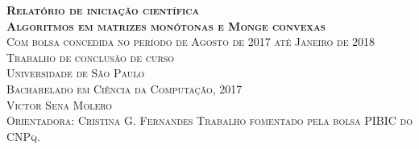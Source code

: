 \documentclass[11pt,openany]{book}
\begin{document}

\frontmatter

\thispagestyle{empty}
\begin{center}
\Large \textbf{\textsc{Relatório de iniciação científica}} \\
\large \textbf{\textsc{Algoritmos em matrizes monótonas e Monge convexas}} \\
\large \textsc{Com bolsa concedida no período de Agosto de 2017 até Janeiro de 2018} \\[120 pt]
\large \textsc{Trabalho de conclusão de curso} \\
\large \textsc{Universidade de São Paulo} \\
\large \textsc{Bacharelado em Ciência da Computação, 2017}\\[120pt]
\large \textsc{Victor Sena Molero} \\
\large \textsc{Orientadora: Cristina G. Fernandes}
\vfill
\large \textsc{Trabalho fomentado pela bolsa PIBIC do CNPq.}
\end{center}





\tableofcontents





\mainmatter







% 

% 


\nocite{*}



\end{document}
